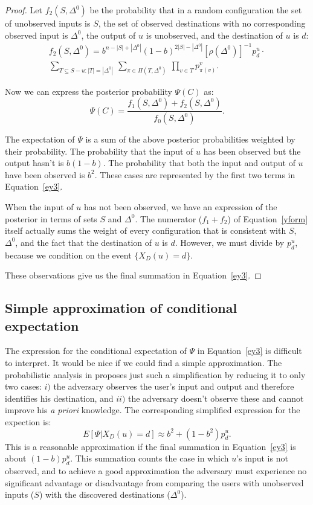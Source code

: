 \documentclass[prodmode,acmtissec]{acmsmall}
\begin{document}
\begin{proof}
Let $f_2(S,\Delta^0)$ be the probability that in a random configuration the set of unobserved inputs is $S$, the set of observed destinations with no corresponding observed input is $\Delta^0$, the output of $u$ is unobserved, and the destination of $u$ is $d$:
\begin{multline*}
f_2(S,\Delta^0) = b^{n-|S|+|\Delta^0|} (1-b)^{2|S|-|\Delta^0|}  [\rho(\Delta^0)]^{-1} p^u_d \cdot \\
\sum_{T\subseteq S-u:|T|=|\Delta^0|} \ \sum_{\pi \in \Pi(T,\Delta^0)} \ \prod_{v\in T} p^v_{\pi(v)}.
\end{multline*}

Now we can express the posterior probability $\Psi(C)$ as:
\begin{equation} \label{yform}
  \Psi(C) = \frac{f_1(S,\Delta^0) + f_2(S,\Delta^0)}{f_0(S,\Delta^0)}.
\end{equation}

The expectation of $\Psi$ is a sum of the above posterior probabilities weighted by their probability.  The probability that the input of $u$ has been observed but the output hasn't is $b(1-b)$.  The probability that both the input and output of $u$ have been observed is $b^2$.  These cases are represented by the first two terms in Equation~\ref{ey3}.

When the input of $u$ has not been observed, we have an expression of the posterior in terms of sets $S$ and $\Delta^0$.  The numerator ($f_1+f_2$) of Equation~\ref{yform} itself actually sums the weight of every configuration that is consistent with $S$, $\Delta^0$, and the fact that the destination of $u$ is $d$.  However, we must divide by $p^u_d$, because we condition on the event $\{X_D(u)=d\}$.

These observations give us the final summation in Equation~\ref{ey3}.
\end{proof}

\subsection{ Simple approximation of conditional expectation}
The expression for the conditional expectation of $\Psi$ in Equation~\ref{ey3} is difficult to interpret.  It would be nice if we could find a simple approximation.  The probabilistic analysis in  proposes just such a simplification by reducing it to only two cases: $i)$ the adversary observes the user's input and output and therefore identifies his destination, and $ii)$ the adversary doesn't observe these and cannot improve his \emph{a priori} knowledge.  The corresponding simplified expression for the expection is:
\begin{equation} \label{lower}
E[\Psi | X_D(u) = d] \approx b^2 + (1-b^2)p^u_d.
\end{equation}
This is a reasonable approximation if the final summation in Equation~\ref{ey3} is about $(1-b)p^u_d$.  This summation counts the case in which $u$'s input is not observed, and to achieve a good approximation the adversary must experience no significant advantage or disadvantage from comparing the users with unobserved inputs ($S$) with the discovered destinations ($\Delta^0$).
\end{document}
